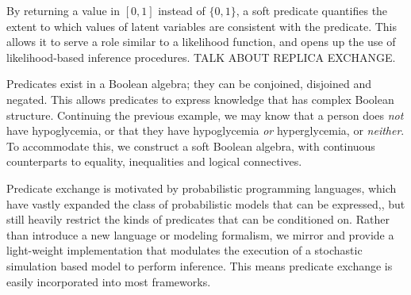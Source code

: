 By returning a value in $[0, 1]$ instead of $\{0, 1\}$, a soft predicate quantifies the extent to which values of latent variables are consistent with the predicate.
This allows it to serve a role similar to a likelihood function, and opens up the use of likelihood-based inference procedures.
TALK ABOUT REPLICA EXCHANGE.

Predicates exist in a Boolean algebra; they can be conjoined, disjoined and negated.
This allows predicates to express knowledge that has complex Boolean structure.
Continuing the previous example, we may know that a person does \emph{not} have hypoglycemia, or that they have hypoglycemia \emph{or} hyperglycemia, or \emph{neither}.
To accommodate this, we construct a soft Boolean algebra, with continuous counterparts to equality, inequalities and logical connectives.





Predicate exchange is motivated by probabilistic programming languages, which have vastly expanded the class of probabilistic models that can be expressed,, but still heavily restrict the kinds of predicates that can be conditioned on.
Rather than introduce a new language or modeling formalism, we mirror   \cite{wingate2011lightweight} and provide a light-weight implementation that modulates the execution of a stochastic simulation based model to perform inference.
This means predicate exchange is easily incorporated into most frameworks. 

